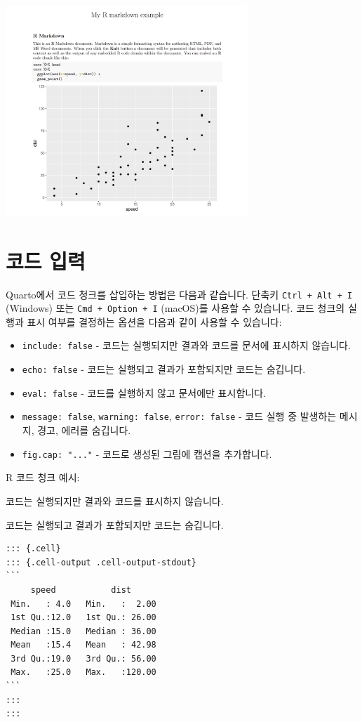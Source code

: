 \documentclass[
  a4paper,
]{book}
\providecommand{\tightlist}{%
  \setlength{\itemsep}{0pt}\setlength{\parskip}{0pt}}\usepackage{longtable,booktabs,array}
\begin{document}
\includegraphics[width=3.59375in,height=\textheight]{images/rmarkdown/ex_pdf.PNG}

\hypertarget{uxcf54uxb4dc-uxc785uxb825-1}{%
\section{코드 입력}\label{uxcf54uxb4dc-uxc785uxb825-1}}

Quarto에서 코드 청크를 삽입하는 방법은 다음과 같습니다. 단축키
\texttt{Ctrl\ +\ Alt\ +\ I} (Windows) 또는 \texttt{Cmd\ +\ Option\ +\ I}
(macOS)를 사용할 수 있습니다. 코드 청크의 실행과 표시 여부를 결정하는
옵션을 다음과 같이 사용할 수 있습니다:

\begin{itemize}
\tightlist
\item
  \texttt{include:\ false} - 코드는 실행되지만 결과와 코드를 문서에
  표시하지 않습니다.
\item
  \texttt{echo:\ false} - 코드는 실행되고 결과가 포함되지만 코드는
  숨깁니다.
\item
  \texttt{eval:\ false} - 코드를 실행하지 않고 문서에만 표시합니다.
\item
  \texttt{message:\ false}, \texttt{warning:\ false},
  \texttt{error:\ false} - 코드 실행 중 발생하는 메시지, 경고, 에러를
  숨깁니다.
\item
  \texttt{fig.cap:\ "..."} - 코드로 생성된 그림에 캡션을 추가합니다.
\end{itemize}

R 코드 청크 예시:

코드는 실행되지만 결과와 코드를 표시하지 않습니다.

코드는 실행되고 결과가 포함되지만 코드는 숨깁니다.

\begin{verbatim}
::: {.cell}
::: {.cell-output .cell-output-stdout}
```
     speed           dist       
 Min.   : 4.0   Min.   :  2.00  
 1st Qu.:12.0   1st Qu.: 26.00  
 Median :15.0   Median : 36.00  
 Mean   :15.4   Mean   : 42.98  
 3rd Qu.:19.0   3rd Qu.: 56.00  
 Max.   :25.0   Max.   :120.00  
```
:::
:::
\end{verbatim}
\end{document}
